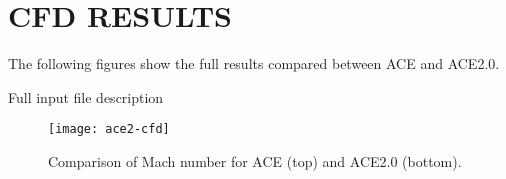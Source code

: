 %
%	 
%


\chapter{CFD RESULTS}
\label{appendix:cfd}

The following figures show the full results compared between ACE and ACE2.0.

Full input file description

\begin{figure}[ht!]
    \centering
    \texttt{[image: ace2-cfd]}
    \caption{Comparison of Mach number for ACE (top) and ACE2.0 (bottom).}
    \label{fig:cfd-comparison}
\end{figure}

